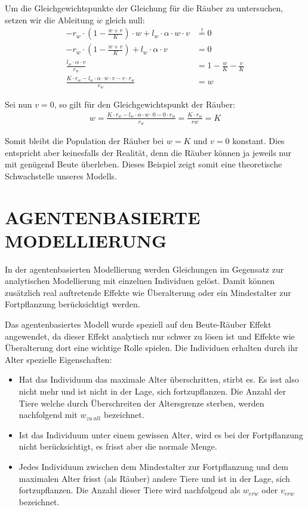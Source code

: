 \documentclass[a4paper,twoside]{article}
\begin{document}
	Um die Gleichgewichtspunkte der Gleichung für die Räuber zu untersuchen, setzen wir die Ableitung \(\dot{w}\) gleich null:
	\begin{align*}
		-r_w \cdot \left(1 - \frac{w+v}{K} \right) \cdot w + l_w \cdot \alpha \cdot w \cdot v &\stackrel{!}{=} 0\\
		-r_w \cdot \left(1 - \frac{w+v}{K} \right) + l_w \cdot \alpha \cdot v &= 0\\
		\frac{l_w \cdot \alpha \cdot v}{r_w} &= 1 - \frac{w}{K}-\frac{v}{K}\\
		\frac{K \cdot r_w - l_w \cdot \alpha \cdot w \cdot v - v \cdot r_w}{r_w} &= w
	\end{align*}
	
	Sei nun \(v=0\), so gilt für den Gleichgewichtspunkt der Räuber:
	\begin{align*}
		w = \frac{K \cdot r_w - l_w \cdot \alpha \cdot w \cdot 0 - 0 \cdot r_w}{r_w} = \frac{K \cdot r_w}{rw} = K
	\end{align*}	
	
	Somit bleibt die Population der Räuber bei \(w=K\) und \(v=0\) konstant. Dies entspricht aber keinesfalls der Realität, denn die Räuber können ja jeweils nur mit genügend Beute überleben. Dieses Beispiel zeigt somit eine theoretische Schwachstelle unseres Modells.
	
	\newpage
	
	\section{\uppercase{Agentenbasierte Modellierung}}
	
	In der agentenbasierten Modellierung werden Gleichungen im Gegensatz zur analytischen Modellierung mit einzelnen Individuen gelöst. Damit können zusätzlich real auftretende Effekte wie Überalterung oder ein Mindestalter zur Fortpflanzung berücksichtigt werden.
	
	Das agentenbasiertes Modell wurde speziell auf den Beute-Räuber Effekt angewendet, da dieser Effekt analytisch nur schwer zu lösen ist und Effekte wie Überalterung dort eine wichtige Rolle spielen. Die Individuen erhalten durch ihr Alter spezielle Eigenschaften:
	\begin{itemize}
		\item Hat das Individuum das maximale Alter überschritten, stirbt es. Es isst also nicht mehr und ist nicht in der Lage, sich fortzupflanzen. Die Anzahl der Tiere welche durch Überschreiten der Altersgrenze sterben, werden nachfolgend mit \(w_{zu~alt}\) bezeichnet.
		\item Ist das Individuum unter einem gewissen Alter, wird es bei der Fortpflanzung nicht berücksichtigt, es frisst aber die normale Menge.
		\item Jedes Individuum zwischen dem Mindestalter zur Fortpflanzung und dem maximalen Alter frisst (als Räuber) andere Tiere und ist in der Lage, sich fortzupflanzen. Die Anzahl dieser Tiere wird nachfolgend als \(w_{erw}\) oder \(v_{erw}\) bezeichnet.
	\end{itemize}
	
\end{document}

